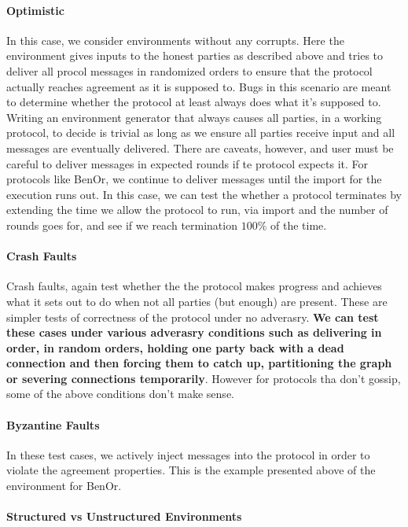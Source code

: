 \paragraph{Optimistic}
In this case, we consider environments without any corrupts.
Here the environment gives inputs to the honest parties as described above and tries to deliver all procol messages in randomized orders to ensure that the protocol actually reaches agreement as it is supposed to.
Bugs in this scenario are meant to determine whether the protocol at least always does what it's supposed to. 
Writing an environment generator that always causes all parties, in a working protocol, to decide is trivial as long as we ensure all parties receive input and all messages are eventually delivered.
There are caveats, however, and user must be careful to deliver messages in expected rounds if te protocol expects it.
For protocols like BenOr, we continue to deliver messages until the import for the execution runs out. 
In this case, we can test the whether a protocol terminates by extending the time we allow the protocol to run, via import and the number of rounds \Z goes for, and see if we reach termination $100\%$ of the time. 

\paragraph{Crash Faults}
Crash faults, again test whether the the protocol makes progress and achieves what it sets out to do when not all parties (but enough) are present.
These are simpler tests of correctness of the protocol under no adverasry. 
\textbf{We can test these cases under various adverasry conditions such as delivering in order, in random orders, holding one party back with a dead connection and then forcing them to catch up, partitioning the graph or severing connections temporarily}.
However for protocols tha don't gossip, some of the above conditions don't make sense.

\paragraph{Byzantine Faults}
In these test cases, we actively inject messages into the protocol in order to violate the agreement properties. 
This is the example presented above of the environment for BenOr.

\paragraph{Structured vs Unstructured Environments}


